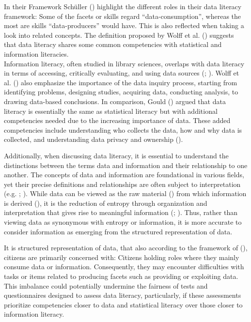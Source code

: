 \documentclass[
  12pt,
  a4paper,
  twoside]{article}
\begin{document}
In their Framework Schüller () highlight the different roles in their data literacy framework: Some of the facets or skills regard ``data-consumption'', whereas the most are skills ``data-producers'' would have. This is also reflected when taking a look into related concepts. The definition proposed by Wolff et al. () suggests that data literacy shares some common competencies with statistical and information literacies.\\
Information literacy, often studied in library sciences, overlaps with data literacy in terms of accessing, critically evaluating, and using data sources (; ). Wolff et al. () also emphasize the importance of the data inquiry process, starting from identifying problems, designing studies, acquiring data, conducting analysis, to drawing data-based conclusions. In comparison, Gould () argued that data literacy is essentially the same as statistical literacy but with additional competencies needed due to the increasing importance of data. These added competencies include understanding who collects the data, how and why data is collected, and understanding data privacy and ownership ().

Additionally, when discussing data literacy, it is essential to understand the distinctions between the terms data and information and their relationship to one another. The concepts of data and information are foundational in various fields, yet their precise definitions and relationships are often subject to interpretation (e.g. ; ). While data can be viewed as the raw material () from which information is derived (), it is the reduction of entropy through organization and interpretation that gives rise to meaningful information (; ). Thus, rather than viewing data as synonymous with entropy or information, it is more accurate to consider information as emerging from the structured representation of data.

It is structured representation of data, that also according to the framework of (), citizens are primarily concerned with: Citizens holding roles where they mainly consume data or information. Consequently, they may encounter difficulties with tasks or items related to producing facets such as providing or exploiting data. This imbalance could potentially undermine the fairness of tests and questionnaires designed to assess data literacy, particularly, if these assessments prioritize competencies closer to data and statistical literacy over those closer to information literacy.
\end{document}
